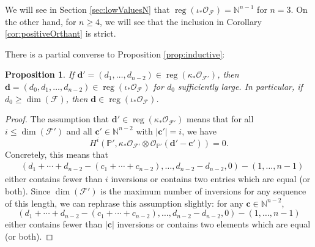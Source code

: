 \documentclass[12pt,reqno]{amsart}
\newtheorem{proposition}[theorem]{Proposition}
\theoremstyle{definition}
\theoremstyle{remark}
\newcommand{\reg}{\operatorname{reg}}
\newcommand{\calF}{{\mathcal{F}}}
\newcommand{\calO}{{\mathcal{O}}}
\begin{document}
We will see in Section \ref{sec:lowValuesN} that $\reg(\iota_*\calO_{\calF}) = \mathbb N^{n-1}$ for $n=3$.  On the other hand, for $n\geq 4$, we will see that the inclusion in Corollary \ref{cor:positiveOrthant} is strict.

There is a partial converse to Proposition \ref{prop:inductive}:

\begin{proposition}
\label{prop:inductive2}
    If $\mathbf d' = (d_1,\ldots,d_{n-2}) \in \reg(\kappa_*\calO_{\calF'})$, then $\mathbf{d} = (d_0,d_1,\ldots,d_{n-2}) \in \reg(\iota_*\calO_{\calF})$ for $d_0$ sufficiently large.  In particular, if $d_0 \geq \dim(\calF)$, then $\mathbf{d} \in \reg(\iota_*\calO_{\calF})$.
\end{proposition}

\begin{proof} 
    The assumption that $\mathbf d' \in \reg(\kappa_*\calO_{\calF'})$ means that for all $i \leq \dim(\calF')$ and all $\mathbf c' \in \mathbb N^{n-2}$ with $|\mathbf{c'}| = i$, we have
    \begin{equation*}
        H^i(\mathbb P', \kappa_*\calO_{\calF'}\otimes\calO_{\mathbb P'}(\mathbf d'-\mathbf c')) = 0.
    \end{equation*}
    Concretely, this means that
    \begin{align*}
        &(d_1+\cdots+d_{n-2}-(c_1+\cdots+c_{n-2}),\ldots,d_{n-2}-d_{n-2},0) - (1,\ldots,n-1)
    \end{align*}
    either contains fewer than $i$ inversions or contains two entries which are equal (or both).  Since $\dim(\calF')$ is the maximum number of inversions for any sequence of this length, we can rephrase this assumption slightly: for any $\mathbf c \in \mathbb N^{n-2}$,
    \begin{equation}\label{eqn:cohomologyF'}
        (d_1+\cdots+d_{n-2}-(c_1+\cdots+c_{n-2}),\ldots,d_{n-2}-d_{n-2},0) - (1,\ldots,n-1)
    \end{equation}
    either contains fewer than $|\mathbf{c}|$ inversions or contains two elements which are equal (or both).


\end{proof}
\end{document}
